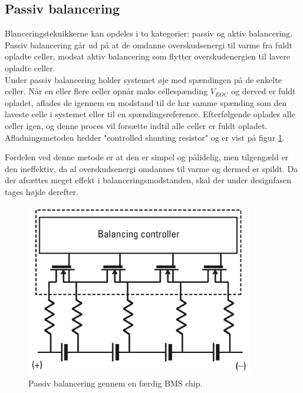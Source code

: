 \subsection{Passiv balancering}
Blanceringsteknikkerne kan opdeles i to kategorier: passiv og aktiv balancering. Passiv balancering går ud på at de omdanne overskudsenergi til varme fra fuldt opladte celler, modsat aktiv balancering som flytter overskudenergien til lavere opladte celler.
\\

Under passiv balancering holder systemet øje med spændingen på de enkelte celler. Når en eller flere celler opnår maks cellespænding $V_{EOC}$ og derved er fuldt opladet, aflades de igennem en modstand til de har samme spænding som den laveste celle i systemet eller til en spændingsreference. Efterfølgende oplades alle celler igen, og denne proces vil forsætte indtil alle celler er fuldt opladet. Afladningsmetoden hedder "controlled shunting resistor" og er vist på figur \ref{fig:passiv_balancering_teknik}. 



Fordelen ved denne metode er at den er simpel og pålidelig, men tilgengæld er den ineffektiv, da al overskudsenergi omdannes til varme og dermed er spildt. Da der afsættes meget effekt i balanceringsmodstanden, skal der under designfasen tages højde derefter.

\begin{figure}[h]
	\centering
	\includegraphics[width=10cm]{billeder/passiv_balancering.png}
	\caption{Passiv balancering gennem en færdig BMS chip.}
	\label{fig:passiv_balancering_teknik}
\end{figure}




